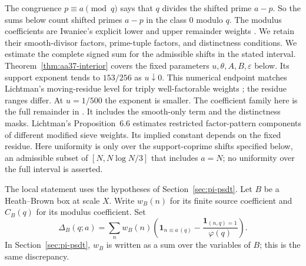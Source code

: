 \documentclass{amsart}
\numberwithin{equation}{section}
\theoremstyle{definition}
\theoremstyle{plain}
\begin{document}
The congruence $p\equiv a\pmod q$ says that $q$ divides the
shifted prime $a-p$. So the sums below count shifted primes
$a-p$ in the class $0$ modulo $q$.
The modulus coefficients are Iwaniec's explicit lower and upper
remainder weights \cite[Theorem~4]{AA37}.
We retain their smooth-divisor factors, prime-tuple factors, and
distinctness conditions. We estimate the complete signed sum for
the admissible shifts in the stated interval. Theorem~\ref{thm:aa37-interior}
covers the fixed parameters $u,\theta,A,B,\varepsilon$ below.
Its support exponent tends to $153/256$ as $u\downarrow0$. This numerical
endpoint matches Lichtman's moving-residue level for triply well-factorable
weights \cite[Theorem~1.7, (1.7)]{Lichtman23}; the residue ranges differ.
At $u=1/500$ the exponent is smaller.
The coefficient family here is the full remainder in
\cite[Theorem~4]{AA37}. It includes the smooth-only term and the
distinctness masks. Lichtman's Proposition~6.6 estimates restricted
factor-pattern components of different modified sieve weights. Its
implied constant depends on the fixed residue. Here uniformity is only over
the support-coprime shifts specified below, an admissible subset of
$[N,N\log N/3]$ that includes $a=N$; no uniformity over the full interval
is asserted.

The local statement uses the hypotheses of Section~\ref{sec:pi-psdt}.
Let $B$ be a Heath--Brown box at scale $X$. Write $w_B(n)$ for its
finite source coefficient and $C_B(q)$ for its modulus coefficient.
Set
\[
 \Delta_B(q;a)=\sum_{n}w_B(n)
 \left(\mathbf1_{n\equiv a\, (q)}
       -\frac{\mathbf1_{(n,q)=1}}{\varphi(q)}\right).
\]
In Section~\ref{sec:pi-psdt}, $w_B$ is written as a sum over the
variables of $B$; this is the same discrepancy.
\end{document}
